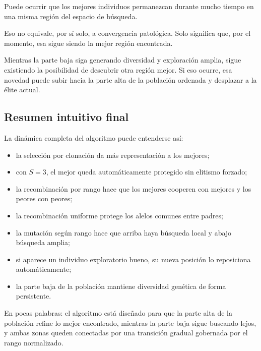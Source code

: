 \documentclass[11pt]{article}
\begin{document}
Puede ocurrir que los mejores individuos permanezcan durante mucho tiempo en una
misma regi\'on del espacio de b\'usqueda.

Eso no equivale, por s\'i solo, a convergencia patol\'ogica. Solo significa
que, por el momento, esa sigue siendo la mejor regi\'on encontrada.

Mientras la parte baja siga generando diversidad y exploraci\'on amplia, sigue
existiendo la posibilidad de descubrir otra regi\'on mejor. Si eso ocurre, esa
novedad puede subir hacia la parte alta de la poblaci\'on ordenada y desplazar a
la \'elite actual.

\subsection{Resumen intuitivo final}

La din\'amica completa del algoritmo puede entenderse as\'i:

\begin{itemize}
  \item la selecci\'on por clonaci\'on da m\'as representaci\'on a los mejores;
  \item con \(S=3\), el mejor queda autom\'aticamente protegido sin elitismo
  forzado;
  \item la recombinaci\'on por rango hace que los mejores cooperen con mejores y
  los peores con peores;
  \item la recombinaci\'on uniforme protege los alelos comunes entre padres;
  \item la mutaci\'on seg\'un rango hace que arriba haya b\'usqueda local y abajo
  b\'usqueda amplia;
  \item si aparece un individuo exploratorio bueno, su nueva posici\'on lo
  reposiciona autom\'aticamente;
  \item la parte baja de la poblaci\'on mantiene diversidad gen\'etica de forma
  persistente.
\end{itemize}

En pocas palabras: el algoritmo est\'a dise\~nado para que la parte alta de la
poblaci\'on refine lo mejor encontrado, mientras la parte baja sigue buscando
lejos, y ambas zonas queden conectadas por una transici\'on gradual gobernada
por el rango normalizado.
\end{document}
